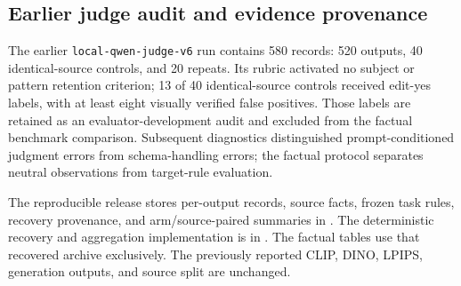 \subsection{Earlier judge audit and evidence provenance}
The earlier \texttt{local-qwen-judge-v6} run contains 580 records: 520 outputs, 40 identical-source controls, and 20 repeats. Its rubric activated no subject or pattern retention criterion; 13 of 40 identical-source controls received edit-yes labels, with at least eight visually verified false positives. Those labels are retained as an evaluator-development audit and excluded from the factual benchmark comparison. Subsequent diagnostics distinguished prompt-conditioned judgment errors from schema-handling errors; the factual protocol separates neutral observations from target-rule evaluation.

The reproducible release stores per-output records, source facts, frozen task rules, recovery provenance, and arm/source-paired summaries in . The deterministic recovery and aggregation implementation is in . The factual tables use that recovered archive exclusively. The previously reported CLIP, DINO, LPIPS, generation outputs, and source split are unchanged.
